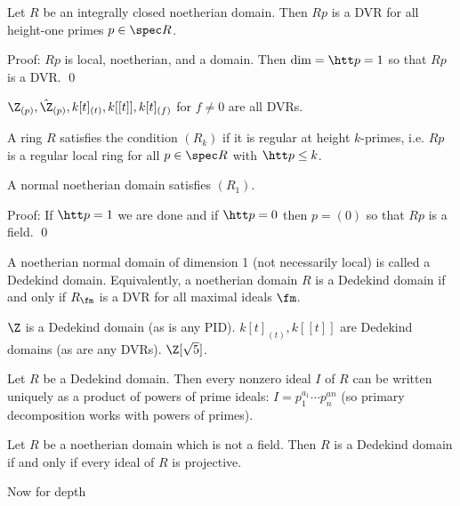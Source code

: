 \begin{cor}
Let $R$ be an integrally closed noetherian domain. Then $Rp$ is a DVR for all height-one primes $p \in \spec R$.
\end{cor}

\noindent Proof: $Rp$ is local, noetherian, and a domain. Then $\dim=\htt p=1$ so that $Rp$ is a DVR. \qed \\

\begin{ex}
$\Z_{(p)}, \hat{\Z}_{(p)}, k[t]_{(t)}, k[[t]], k[t]_{(f)}$ for $f \neq 0$ are all DVRs. 
\end{ex}

\begin{dfn}
A ring $R$ satisfies the condition $(R_k)$ if it is regular at height $k$-primes, i.e. $Rp$ is a regular local ring for all $p \in \spec R$ with $\htt p \leq k$. 
\end{dfn}

\begin{cor}
A normal noetherian domain satisfies $(R_1)$.
\end{cor}

\noindent Proof: If $\htt p=1$ we are done and if $\htt p=0$ then $p=(0)$ so that $Rp$ is a field. \qed \\

\begin{dfn}
A noetherian normal domain of dimension 1 (not necessarily local) is called a Dedekind domain. Equivalently, a noetherian domain $R$ is a Dedekind domain if and only if $R_\fm$ is a DVR for all maximal ideals $\fm$.
\end{dfn}

\begin{ex}
$\Z$ is a Dedekind domain (as is any PID). $k[t]_{(t)}, k[[t]]$ are Dedekind domains (as are any DVRs). $\Z[\sqrt{5}]$. 
\end{ex}

\begin{thmm}
Let $R$ be a Dedekind domain. Then every nonzero ideal $I$ of $R$ can be written uniquely as a product of powers of prime ideals: $I=p_1^{a_1}\cdots p_n^{an}$ (so primary decomposition works with powers of primes).
\end{thmm}

\begin{thmm}
Let $R$ be a noetherian domain which is not a field. Then $R$ is a Dedekind domain if and only if every ideal of $R$ is projective. 
\end{thmm}


\LARGE{Now for depth}